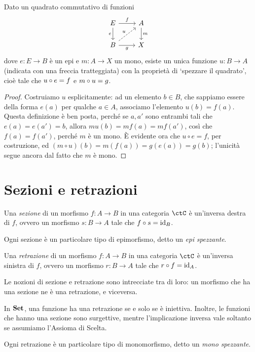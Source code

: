 \begin{proposition}
	Dato un quadrato commutativo di funzioni
	\[\begin{tikzcd}
			E \ar[r,"f"]\ar[d, "e"']& A\ar[d, "m"] \\
			B \ar[r, "g"']\ar[ur,dashed,"u"] & X
		\end{tikzcd}\]
	dove \(e : E\to B\) è un epi e \(m : A \to X\) un mono, esiste un unica funzione \(u : B\to A\) (indicata con una freccia tratteggiata) con la proprietà di `spezzare il quadrato', cioè tale che \(u\circ e=f\) e \(m\circ u=g\).
\end{proposition}
\begin{proof}
	Costruiamo \(u\) esplicitamente: ad un elemento \(b\in B\), che sappiamo essere della forma \(e(a)\) per qualche \(a\in A\), associamo l'elemento \(u(b)=f(a)\). Questa definizione è ben posta, perché se \(a,a'\) sono entrambi tali che \(e(a)=e(a')=b\), allora \(mu(b)=mf(a)=mf(a')\), così che \(f(a)=f(a')\), perché \(m\) è un mono. \`E evidente ora che \(u\circ e= f\), per costruzione, ed \((m\circ u)(b)=m(f(a))=g(e(a))=g(b)\); l'unicità segue ancora dal fatto che \(m\) è mono.
\end{proof}
\section{Sezioni e retrazioni}

\begin{definition}[Sezione]
	Una \emph{sezione} di un morfismo \(f \colon A \to B\) in una categoria \(\ctC\) è un'inversa destra di \(f\), ovvero un morfismo \(s \colon B \to A\) tale che \(f \circ s = \mathrm{id}_{B}\).
\end{definition}
Ogni sezione è un particolare tipo di epimorfismo, detto un \emph{epi spezzante}.
\begin{definition}[Retrazione]
	Una \emph{retrazione} di un morfismo \(f \colon A \to B\) in una categoria \(\ctC\) è un'inversa sinistra di \(f\), ovvero un morfismo \(r \colon B \to A\) tale che \(r \circ f = \mathrm{id}_{A}\).
\end{definition}

Le nozioni di sezione e retrazione sono intrecciate tra di loro:
un morfismo che ha una sezione ne è una retrazione,
e viceversa.

\begin{example}
	In \(\mathbf{Set}\), una funzione ha una retrazione se e solo se è iniettiva.
	Inoltre, le funzioni che hanno una sezione sono surgettive,
	mentre l'implicazione inversa vale soltanto se assumiamo l'Assioma di Scelta.

\end{example}
Ogni retrazione è un particolare tipo di monomorfismo, detto un \emph{mono spezzante}.
